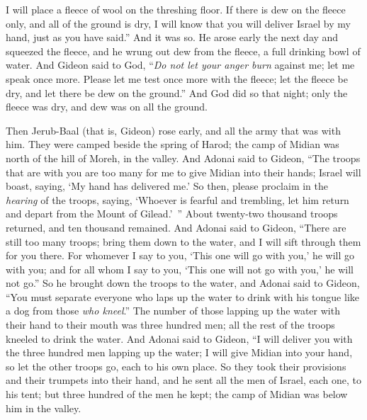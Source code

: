 \begin{biblechapter}
\verse I will place a fleece of wool on the threshing floor. If there is dew on the fleece only, and all of the ground is dry, I will know that you will deliver Israel by my hand, just as you have said.”
\verse And it was so. He arose early the next day and squeezed the fleece, and he wrung out dew from the fleece, a full drinking bowl of water.
\verse And Gideon said to God, “\textit{Do not let your anger burn} against me; let me speak once more. Please let me test once more with the fleece; let the fleece be dry, and let there be dew on the ground.”
\verse And God did so that night; only the fleece was dry, and dew was on all the ground.
\end{biblechapter}

\begin{biblechapter} %
 Then Jerub-Baal (that is, Gideon) rose early, and all the army that was with him. They were camped beside the spring of Harod; the camp of Midian was north of the hill of Moreh, in the valley.
\verse And Adonai said to Gideon, “The troops that are with you are too many for me to give Midian into their hands; Israel will boast, saying, ‘My hand has delivered me.’
\verse So then, please proclaim in the \textit{hearing} of the troops, saying, ‘Whoever is fearful and trembling, let him return and depart from the Mount of Gilead.’ ” About twenty-two thousand troops returned, and ten thousand remained.
\verse And Adonai said to Gideon, “There are still too many troops; bring them down to the water, and I will sift through them for you there. For whomever I say to you, ‘This one will go with you,’ he will go with you; and for all whom I say to you, ‘This one will not go with you,’ he will not go.”
\verse So he brought down the troops to the water, and Adonai said to Gideon, “You must separate everyone who laps up the water to drink with his tongue like a dog from those \textit{who kneel}.”
\verse The number of those lapping up the water with their hand to their mouth was three hundred men; all the rest of the troops kneeled to drink the water.
\verse And Adonai said to Gideon, “I will deliver you with the three hundred men lapping up the water; I will give Midian into your hand, so let the other troops go, each to his own place.
\verse So they took their provisions and their trumpets into their hand, and he sent all the men of Israel, each one, to his tent; but three hundred of the men he kept; the camp of Midian was below him in the valley.

\end{biblechapter}
